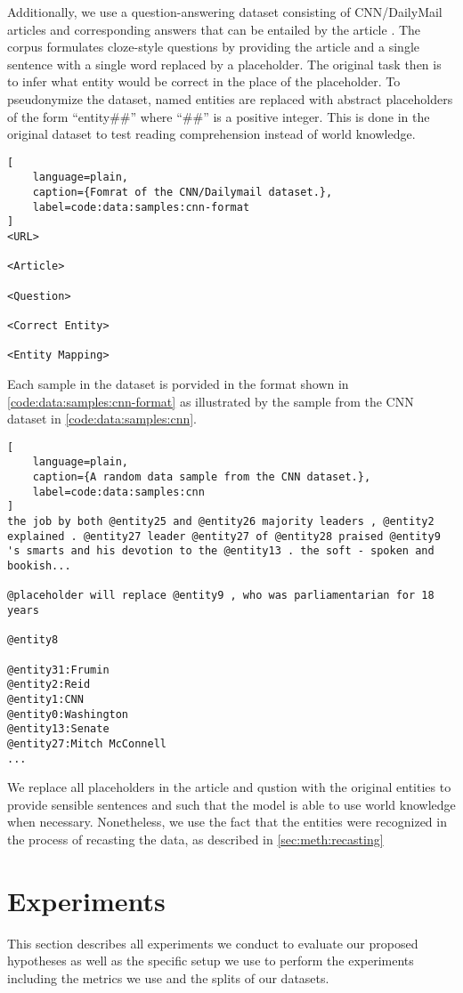 Additionally, we use a question-answering dataset consisting of CNN/DailyMail articles and corresponding answers that can be entailed by the article \cite{cnn1}. The corpus formulates cloze-style questions by providing the article and a single sentence with a single word replaced by a placeholder. The original task then is to infer what entity would be correct in the place of the placeholder. To pseudonymize the dataset, named entities are replaced with abstract placeholders of the form \enquote{entity\#\#} where \enquote{\#\#} is a positive integer. This is done in the original dataset to test reading comprehension instead of world knowledge.
\begin{lstlisting}[
    language=plain,
    caption={Fomrat of the CNN/Dailymail dataset.},
    label=code:data:samples:cnn-format
]
<URL>

<Article>

<Question>

<Correct Entity>

<Entity Mapping>
\end{lstlisting}

Each sample in the dataset is porvided in the format shown in \autoref{code:data:samples:cnn-format} as illustrated by the sample from the CNN dataset in \autoref{code:data:samples:cnn}.

\begin{lstlisting}[
    language=plain,
    caption={A random data sample from the CNN dataset.},
    label=code:data:samples:cnn
]
the job by both @entity25 and @entity26 majority leaders , @entity2 explained . @entity27 leader @entity27 of @entity28 praised @entity9 's smarts and his devotion to the @entity13 . the soft - spoken and bookish...

@placeholder will replace @entity9 , who was parliamentarian for 18 years

@entity8

@entity31:Frumin
@entity2:Reid
@entity1:CNN
@entity0:Washington
@entity13:Senate
@entity27:Mitch McConnell
...
\end{lstlisting}

We replace all placeholders in the article and qustion with the original entities to provide sensible sentences and such that the model is able to use world knowledge when necessary. Nonetheless, we use the fact that the entities were recognized in the process of recasting the data, as described in \autoref{sec:meth:recasting}

\section{Experiments} \label{sec:experiments}
This section describes all experiments we conduct to evaluate our proposed hypotheses as well as the specific setup we use to perform the experiments including the metrics we use and the splits of our datasets.

